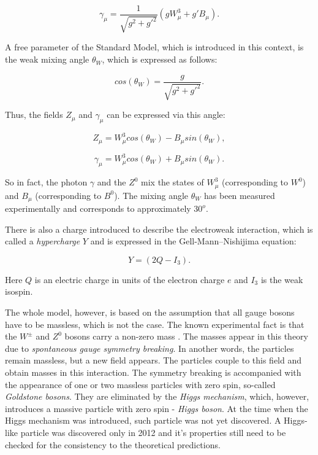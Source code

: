 \begin{equation}\label{eq:Amu}
 \gamma_{\mu} = \frac{1}{\sqrt{g^{2} + g'^{2}}}(gW^{3}_{\mu} + g'B_{\mu}).
\end{equation}

A free parameter of the Standard Model, which is introduced in this context, is the weak mixing angle $\theta_{W}$, which is expressed as follows:

\begin{equation}
 cos(\theta_{W}) = \frac{g}{\sqrt{g^{2}+g'^{2}}}.
\end{equation}

Thus, the fields $Z_{\mu}$ and $\gamma_{\mu}$ can be expressed via this angle:

\begin{equation}
 Z_{\mu} = W^{3}_{\mu}cos(\theta_{W}) - B_{\mu}sin(\theta_{W}),
\end{equation}

\begin{equation}
 \gamma_{\mu} = W^{3}_{\mu}cos(\theta_{W}) + B_{\mu}sin(\theta_{W}).
\end{equation}

So in fact, the photon $\gamma$ and the $Z^{0}$ mix the states of $W^{3}_{\mu}$ (corresponding to $W^{0}$) and $B_{\mu}$ (corresponding to $B^{0}$).
The mixing angle $\theta_{W}$ has been measured experimentally \cite{PDG-2012} and corresponds to approximately $30^{o}$.

There is also a charge introduced to describe the electroweak interaction, which is called a \textit{hypercharge} $Y$ and is expressed in the Gell-Mann--Nishijima
equation:

\begin{equation}
 Y = (2Q - I_{3}).
\end{equation}

Here $Q$ is an electric charge in units of the electron charge $e$ and $I_{3}$ is the weak isospin.

The whole model, however, is based on the assumption that all gauge bosons have to be massless, which is not the case. The known experimental fact
is that the $W^{\pm}$ and $Z^{0}$ bosons carry a non-zero mass \cite{PDG-2012}. The masses appear in this theory due to \textit{spontaneous gauge symmetry
breaking}. In another words, the particles remain massless, but a new field appears. The particles couple to this field and obtain masses in this
interaction. The symmetry breaking is accompanied with the appearance of one or two massless particles with zero spin, so-called \textit{Goldstone bosons}.
They are eliminated by the \textit{Higgs mechanism}\cite{1964PhRvL..13..508H}, which, however, introduces a massive particle with zero spin - \textit{Higgs boson}. At the time when the
Higgs mechanism was introduced, such particle was not yet discovered. A Higgs-like particle was discovered only in 2012 \cite{Aad20121, Chatrchyan:2012xdj} 
and it's properties still need to be checked for the consistency to the theoretical predictions.


